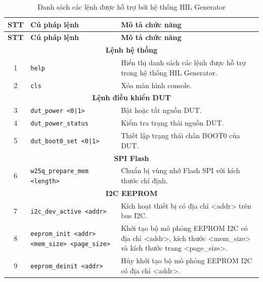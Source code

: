 \begin{longtable}{|c|p{4.8cm}|p{7.2cm}|}
\caption{Danh sách các lệnh được hỗ trợ bởi hệ thống HIL Generator}
\label{tab:hil_command_list} \\

\hline
\textbf{STT} & \textbf{Cú pháp lệnh} & \textbf{Mô tả chức năng} \\
\hline
\endfirsthead

\hline
\textbf{STT} & \textbf{Cú pháp lệnh} & \textbf{Mô tả chức năng} \\
\hline
\endhead

\multicolumn{3}{|c|}{\textbf{Lệnh hệ thống}} \\
\hline

1
& \texttt{help}
& Hiển thị danh sách các lệnh được hỗ trợ trong hệ thống HIL Generator. \\
\hline

2
& \texttt{cls}
& Xóa màn hình console. \\
\hline

\multicolumn{3}{|c|}{\textbf{Lệnh điều khiển DUT}} \\
\hline

3
& \texttt{dut\_power <0|1>}
& Bật hoặc tắt nguồn DUT. \\
\hline

4
& \texttt{dut\_power\_status}
& Kiểm tra trạng thái nguồn DUT. \\
\hline

5
& \texttt{dut\_boot0\_set <0|1>}
& Thiết lập trạng thái chân BOOT0 của DUT. \\
\hline

\multicolumn{3}{|c|}{\textbf{SPI Flash}} \\
\hline

6
& \texttt{w25q\_prepare\_mem <length>}
& Chuẩn bị vùng nhớ Flash SPI với kích thước chỉ định. \\
\hline

\multicolumn{3}{|c|}{\textbf{I2C EEPROM}} \\
\hline

7
& \texttt{i2c\_dev\_active <addr>}
& Kích hoạt thiết bị có địa chỉ <addr> trên bus I2C. \\
\hline

8
& \texttt{eeprom\_init <addr> <mem\_size> <page\_size>}
& Khởi tạo bộ mô phỏng EEPROM I2C có địa chỉ <addr>, kích thước <mem\_size> và kích thước trang <page\_size>. \\
\hline

9
& \texttt{eeprom\_deinit <addr>}
& Hủy khởi tạo bộ mô phỏng EEPROM I2C có địa chỉ <addr>. \\
\hline


\end{longtable}
